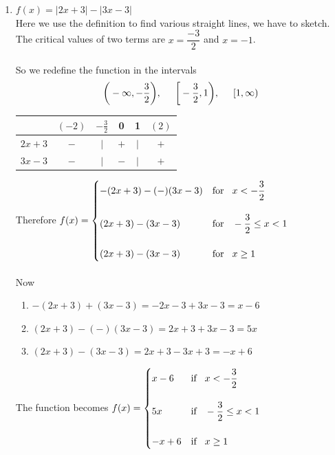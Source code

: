\documentclass[11pt,a4paper]{article}
\begin{document}
\begin{enumerate}
\begin{enumerate}
     
     \item $f(x)=|2x+3|-|3x-3|$\\
     Here we use the definition to find various straight lines, we have to sketch.\\ The critical values of two terms are $x=\dfrac{-3}{2}$ and $x=-1$.\\\\
     So we redefine the function in the intervals $$\bigg(-\infty,-\dfrac{3}{2}\bigg),\hspace{0.5cm} \bigg [-\dfrac{3}{2},1\bigg),\hspace{0.5cm} [1,\infty)$$
     
\begin{table}[H]
\centering
\begin{tabular}{cccccc}
&$(-2)$&$-\frac{3}{2}$&0&1&$(2)$\\
\hline
\multicolumn{1}{c|}{$2x+3$} & $-$ & $|$ & $+$ & $|$ & $+$\\
\multicolumn{1}{c|}{$3x-3$} & $-$ & $|$ & $-$ & $|$ & $+$\\
\end{tabular}
\end{table}


\vspace{0.6cm}
Therefore $f(x)=
\begin{cases}
-(2x+3)-(-)(3x-3) & \text{for}\hspace{0.3cm} x<-\dfrac{3}{2}\\\\
(2x+3)-(3x-3) &\text{for}\hspace{0.3cm} -\dfrac{3}{2}\leq x<1\\\\
(2x+3)-(3x-3) &\text{for}\hspace{0.3cm}x\geq 1\\
\end{cases}
$\\\\


Now
\begin{enumerate}
         \item $-(2x+3)+(3x-3)=-2x-3+3x-3=x-6$
         \item $(2x+3)-(-)(3x-3)=2x+3+3x-3=5x$
         \item $(2x+3)-(3x-3)=2x+3-3x+3=-x+6$
\end{enumerate}

The function becomes $f(x)=
\begin{cases}
x-6 & \text{if}\hspace{0.3cm} x<-\dfrac{3}{2}\\\\
5x & \text{if} \hspace{0.3cm} -\dfrac{3}{2}\leq x<1\\\\
-x+6 & \text{if}\hspace{0.3cm} x\geq 1\\
\end{cases}
$\\\\\\





\end{enumerate}
\end{enumerate}
\end{document}
